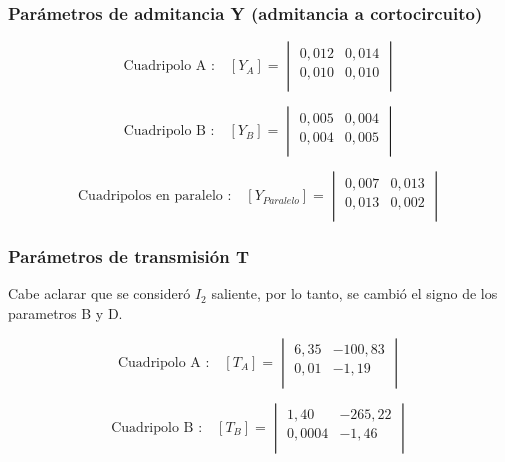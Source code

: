 \documentclass[a4paper]{article}
\begin{document}
\subsubsection*{Parámetros de admitancia Y (admitancia a cortocircuito)}

\begin{equation}
\text{Cuadripolo A :}\quad [Y_{A}] =
\begin{vmatrix}
	0,012 & 0,014\\
	0,010 & 0,010\\
\end{vmatrix}
\end{equation}

\begin{equation}
\text{Cuadripolo B :}\quad [Y_{B}] =
\begin{vmatrix}
	0,005 & 0,004\\
	0,004 & 0,005\\
\end{vmatrix}
\end{equation}

\begin{equation}
\text{Cuadripolos en paralelo :}\quad [Y_{Paralelo}] =
\begin{vmatrix}
	0,007 & 0,013\\
	0,013 & 0,002\\
\end{vmatrix}
\end{equation}

\subsubsection*{Parámetros de transmisión T}

Cabe aclarar que se consideró $I_2$ saliente, por lo tanto, se cambió el signo de los parametros B y D.

\begin{equation}
\text{Cuadripolo A :}\quad [T_{A}] =
\begin{vmatrix}
	6,35 & -100,83\\
	0,01 & -1,19\\
\end{vmatrix}
\end{equation}

\begin{equation}
\text{Cuadripolo B :}\quad [T_{B}] =
\begin{vmatrix}
	1,40 & -265,22\\
	0,0004 & -1,46\\
\end{vmatrix}
\end{equation}
\end{document}
